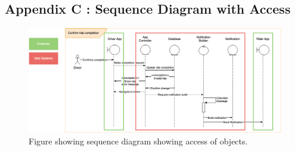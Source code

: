 \documentclass{article}
\begin{document}
    \newpage
    \subsection{Appendix C : Sequence Diagram with Access}
      \begin{figure}[H]
        \centering
        \includegraphics[width=12cm]{assets/sequence_access.drawio.png}
        \caption{Figure showing sequence diagram showing access of objects.}
        \label{fig:sequenceWithSections}
      \end{figure}
\end{document}
